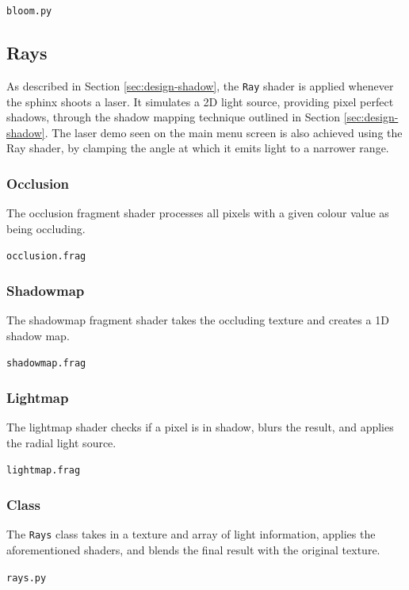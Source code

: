 \documentclass[../main/main.tex]{subfiles}
\begin{document}
\noindent\verb|bloom.py|


\subsection{Rays}
\label{sec:shader-rays}
As described in Section \ref{sec:design-shadow}, the \lstinline{Ray} shader is applied whenever the sphinx shoots a laser. It simulates a 2D light source, providing pixel perfect shadows, through the shadow mapping technique outlined in Section \ref{sec:design-shadow}. The laser demo seen on the main menu screen is also achieved using the Ray shader, by clamping the angle at which it emits light to a narrower range.

\subsubsection*{Occlusion}
The occlusion fragment shader processes all pixels with a given colour value as being occluding.

\noindent\verb|occlusion.frag|


\subsubsection*{Shadowmap}
The shadowmap fragment shader takes the occluding texture and creates a 1D shadow map.

\noindent\verb|shadowmap.frag|


\subsubsection*{Lightmap}
The lightmap shader checks if a pixel is in shadow, blurs the result, and applies the radial light source.

\noindent\verb|lightmap.frag|


\subsubsection*{Class}
The \lstinline{Rays} class takes in a texture and array of light information, applies the aforementioned shaders, and blends the final result with the original texture.

\noindent\verb|rays.py|

\end{document}
